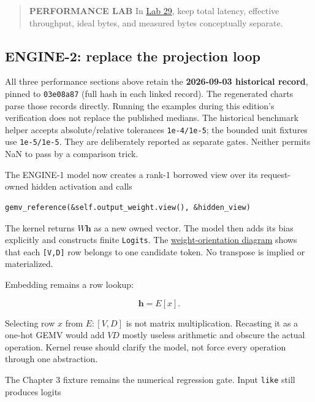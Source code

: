 \documentclass[
  10pt,
]{article}
\begin{document}
\begin{quote}
\textbf{PERFORMANCE LAB} In
\href{https://github.com/hermonai/inside-the-llm-engine/blob/astra-visual-rewrite/labs/lab-29-gemv-vs-gemm.md}{Lab
29}, keep total latency, effective throughput, ideal bytes, and measured
bytes conceptually separate.
\end{quote}

\subsection{ENGINE-2: replace the projection
loop}\label{engine-2-replace-the-projection-loop}

All three performance sections above retain the \textbf{2026-09-03
historical record}, pinned to \texttt{03e08a87} (full hash in each
linked record). The regenerated charts parse those records directly.
Running the examples during this edition's verification does not replace
the published medians. The historical benchmark helper accepts
absolute/relative tolerances \texttt{1e-4/1e-5}; the bounded unit
fixtures use \texttt{1e-5/1e-5}. They are deliberately reported as
separate gates. Neither permits NaN to pass by a comparison trick.

The ENGINE-1 model now creates a rank-1 borrowed view over its
request-owned hidden activation and calls

\begin{verbatim}
gemv_reference(&self.output_weight.view(), &hidden_view)
\end{verbatim}

The kernel returns \(W\mathbf{h}\) as a new owned vector. The model then
adds its bias explicitly and constructs finite \texttt{Logits}. The
\href{https://github.com/hermonai/inside-the-llm-engine/blob/astra-visual-rewrite/diagrams/linear/weight-orientation.txt}{weight-orientation
diagram} shows that each \texttt{{[}V,D{]}} row belongs to one candidate
token. No transpose is implied or materialized.

Embedding remains a row lookup:

\[
\mathbf{h}=E[x].
\]

Selecting row \(x\) from \(E:[V,D]\) is not matrix multiplication.
Recasting it as a one-hot GEMV would add \(VD\) mostly useless
arithmetic and obscure the actual operation. Kernel reuse should clarify
the model, not force every operation through one abstraction.

The Chapter 3 fixture remains the numerical regression gate. Input
\texttt{like} still produces logits
\end{document}
